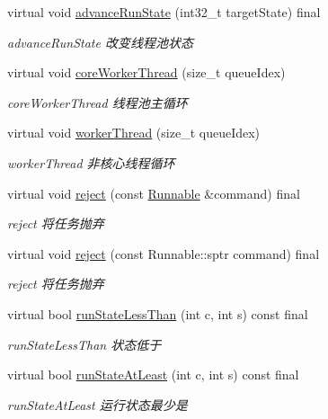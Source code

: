 \begin{DoxyCompactItemize}
virtual void \hyperlink{classThreadPoolExecutor_abaa3926310766a93b7fe1d83b77efdae}{advance\+Run\+State} (int32\+\_\+t target\+State) final
\begin{DoxyCompactList}\small\item\em advance\+Run\+State 改变线程池状态 \end{DoxyCompactList}\item 
virtual void \hyperlink{classThreadPoolExecutor_a5e40839bf4191b5eab9d81227ddb62c3}{core\+Worker\+Thread} (size\+\_\+t queue\+Idex)
\begin{DoxyCompactList}\small\item\em core\+Worker\+Thread 线程池主循环 \end{DoxyCompactList}\item 
virtual void \hyperlink{classThreadPoolExecutor_a844902ce61fb16b11a569b8ee56e80e9}{worker\+Thread} (size\+\_\+t queue\+Idex)
\begin{DoxyCompactList}\small\item\em worker\+Thread 非核心线程循环 \end{DoxyCompactList}\item 
virtual void \hyperlink{classThreadPoolExecutor_a14c4e3d786dcf22e858b11a95d2f77ef}{reject} (const \hyperlink{classRunnable}{Runnable} \&command) final
\begin{DoxyCompactList}\small\item\em reject 将任务抛弃 \end{DoxyCompactList}\item 
virtual void \hyperlink{classThreadPoolExecutor_a353e65b77bb3c0950ed79939473d4852}{reject} (const Runnable\+::sptr command) final
\begin{DoxyCompactList}\small\item\em reject 将任务抛弃 \end{DoxyCompactList}\item 
virtual bool \hyperlink{classThreadPoolExecutor_aa12a3efb879080453fb7abc486585698}{run\+State\+Less\+Than} (int c, int s) const final
\begin{DoxyCompactList}\small\item\em run\+State\+Less\+Than 状态低于 \end{DoxyCompactList}\item 
virtual bool \hyperlink{classThreadPoolExecutor_a44ee48ed44faa12fc6373074e9059e4e}{run\+State\+At\+Least} (int c, int s) const final
\begin{DoxyCompactList}\small\item\em run\+State\+At\+Least 运行状态最少是 \end{DoxyCompactList}\item 

\end{DoxyCompactItemize}

